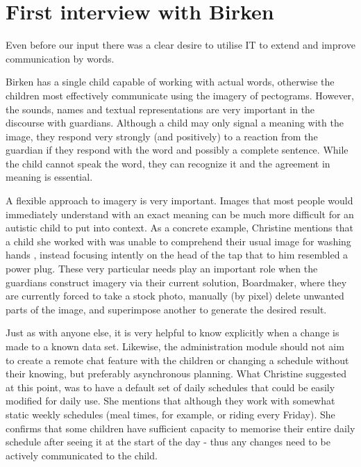 \section{First interview with Birken}


Even before our input there was a clear desire to utilise IT to extend and improve communication by words.

Birken has a single child capable of working with actual words, otherwise the children most effectively communicate using the imagery of pectograms. However, the sounds, names and textual representations are very important in the discourse with guardians. Although a child may only signal a meaning with the image, they respond very strongly (and positively) to a reaction from the guardian if they respond with the word and possibly a complete sentence. While the child cannot speak the word, they can recognize it and the agreement in meaning is essential.

A flexible approach to imagery is very important. Images that most people would immediately understand with an exact meaning can be much more difficult for an autistic child to put into context. As a concrete example, Christine mentions that a child she worked with was unable to comprehend their usual image for washing hands , instead focusing intently on the head of the tap that to him resembled a power plug. These very particular needs play an important role when the guardians construct imagery via their current solution, Boardmaker, where they are currently forced to take a stock photo, manually (by pixel) delete unwanted parts of the image, and superimpose another to generate the desired result.

 Just as with anyone else, it is very helpful to know explicitly when a change is made to a known data set. Likewise, the administration module should not aim to create a remote chat feature with the children or changing a schedule without their knowing, but preferably asynchronous planning. What Christine suggested at this point, was to have a default set of daily schedules that could be easily modified for daily use. She mentions that although they work with somewhat static weekly schedules (meal times, for example, or riding every Friday). She confirms that some children have sufficient capacity to memorise their entire daily schedule after seeing it at the start of the day - thus any changes need to be actively communicated to the child.

